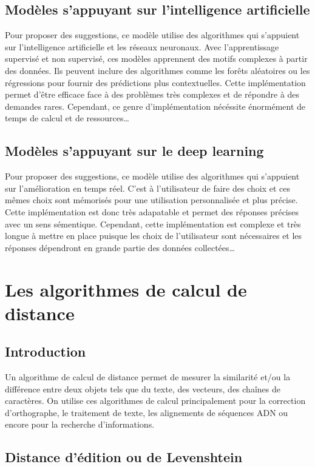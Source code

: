 \documentclass[a4paper, 11pt]{report}
\begin{document}
\section{Modèles s'appuyant sur l'intelligence artificielle}
Pour proposer des suggestions, ce modèle utilise des algorithmes qui s'appuient sur l'intelligence artificielle et les réseaux neuronaux.
Avec l’apprentissage supervisé et non supervisé, ces modèles apprennent des motifs complexes à partir des données. Ils peuvent inclure des algorithmes comme les forêts aléatoires ou les régressions pour fournir des prédictions plus contextuelles.
Cette implémentation permet d'être efficace face à des problèmes très complexes et de répondre à des demandes rares. Cependant, ce genre d'implémentation nécéssite énormément de temps de calcul et de ressources\dots


\section{Modèles s'appuyant sur le deep learning}
Pour proposer des suggestions, ce modèle utilise des algorithmes qui s'appuient sur l'amélioration en temps réel. C'est à l'utilisateur de faire des choix et ces mêmes choix sont mémorisés pour une utilisation personnalisée et plus précise. Cette implémentation est donc très adapatable et permet des réponses précises avec un sens sémentique. Cependant, cette implémentation est complexe et très longue à mettre en place puisque les choix de l'utilisateur sont nécessaires et les réponses dépendront en grande partie des données collectées\dots



\chapter{Les algorithmes de calcul de distance}

\section{Introduction}

Un algorithme de calcul de distance permet de mesurer la similarité et/ou la différence entre deux objets tels que du texte, des vecteurs, des chaînes de caractères. On utilise ces algorithmes de calcul principalement pour la correction d'orthographe, le traitement de texte, les alignements de séquences ADN ou encore pour la recherche d'informations.

\section{Distance d'édition ou de Levenshtein}
\end{document}
